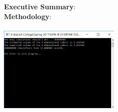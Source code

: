 \documentclass{article}
\begin{document}
\begin{enumerate}
		\textbf{Executive Summary}:\\
		\textbf{Methodology}:\\\\
		\includegraphics[width=16em]{Homework1_q2_Output.png}
	\end{enumerate}
\end{document}
